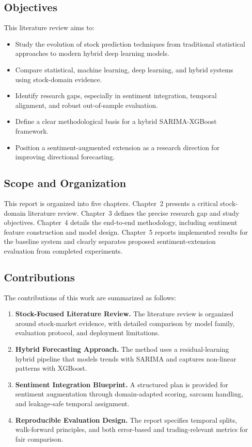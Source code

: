 \subsection{Objectives}
This literature review aims to:
\begin{itemize}
    \item Study the evolution of stock prediction techniques from traditional statistical approaches to modern hybrid deep learning models.
    \item Compare statistical, machine learning, deep learning, and hybrid systems using stock-domain evidence.
    \item Identify research gaps, especially in sentiment integration, temporal alignment, and robust out-of-sample evaluation.
    \item Define a clear methodological basis for a hybrid SARIMA-XGBoost framework.
    \item Position a sentiment-augmented extension as a research direction for improving directional forecasting.
\end{itemize}

\subsection{Scope and Organization}
This report is organized into five chapters. Chapter~2 presents a critical stock-domain literature review. Chapter~3 defines the precise research gap and study objectives. Chapter~4 details the end-to-end methodology, including sentiment feature construction and model design. Chapter~5 reports implemented results for the baseline system and clearly separates proposed sentiment-extension evaluation from completed experiments.

\subsection{Contributions}

The contributions of this work are summarized as follows:

\begin{enumerate}
    \item \textbf{Stock-Focused Literature Review.} The literature review is organized around stock-market evidence, with detailed comparison by model family, evaluation protocol, and deployment limitations.
    \item \textbf{Hybrid Forecasting Approach.} The method uses a residual-learning hybrid pipeline that models trends with SARIMA and captures non-linear patterns with XGBoost.
    \item \textbf{Sentiment Integration Blueprint.} A structured plan is provided for sentiment augmentation through domain-adapted scoring, sarcasm handling, and leakage-safe temporal assignment.
    \item \textbf{Reproducible Evaluation Design.} The report specifies temporal splits, walk-forward principles, and both error-based and trading-relevant metrics for fair comparison.
\end{enumerate}

\newpage

